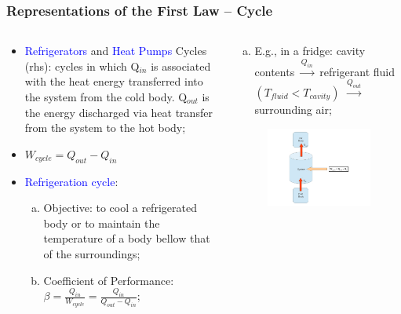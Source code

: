 \documentclass[10pt,compress,handout,ignorenonframetext]{beamer}
\begin{document}
\begin{frame}
 \frametitle{Representations of the First Law -- Cycle}
 \begin{columns}
  \begin{column}[l]{0.5\linewidth}
   \begin{itemize}%
    \item <1-> \textcolor{blue}{Refrigerators} and \textcolor{blue}{Heat Pumps} Cycles (rhs): cycles in which Q$_{in}$ is associated with the heat energy transferred into the system from the cold body. Q$_{out}$ is the energy discharged via heat transfer from the system to the hot body;
    \item <2-> $W_{cycle} = Q_{out} - Q_{in}$%
    \item <3-> \textcolor{blue}{Refrigeration cycle}:
     \begin{enumerate}[(a)]%
      \item <4-> Objective: to cool a refrigerated body or to maintain the temperature of a body bellow that of the surroundings;
      \item <5-> Coefficient of Performance: $\beta = \displaystyle\frac{Q_{in}}{W_{cycle}} = \displaystyle\frac{Q_{in}}{Q_{out} - Q_{in}}$;
     \end{enumerate}
    \end{itemize}
  \end{column}
   
  \begin{column}[c]{0.5\linewidth}
     \begin{enumerate}[(c)]%
      \item <6-> E.g., in a fridge: cavity contents $\xrightarrow{Q_{in}}$ refrigerant fluid $\left(T_{fluid} < T_{cavity}\right)$ $\xrightarrow{Q_{out}}$ surrounding air; 
     \end{enumerate}
\vspace{-.5cm}
   \begin{figure}%
    \begin{center}
     \includegraphics[width=8.cm,clip]{./Pics/FirstLaw_Cycle_02}
    \end{center}
   \end{figure}    
  \end{column}
 \end{columns}
 \normalsize
\end{frame}
\end{document}
